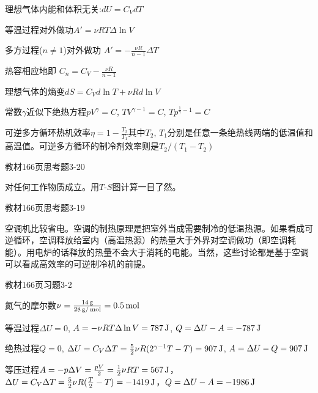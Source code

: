 \documentclass[CJK]{beamer}
\begin{document}
\begin{frame}
  \bch
  \bitem
  \item{理想气体内能和体积无关:$dU = C_V dT$}
  \item{等温过程对外做功$A'=\nu RT \Delta \ln V$}
  \item{
  多方过程($n\ne 1$)对外做功
  $A' = -\frac{\nu R}{n-1}\Delta T$
  
  热容相应地即
  $C_n = C_V - \frac{\nu R}{n-1}$}
  \item{理想气体的熵变$ dS = C_V d \ln T + \nu R d\ln V$}
  \item{常数$\gamma$近似下绝热方程$pV^\gamma = C$, $TV^{\gamma-1} =C$, $Tp^{\frac{1}{\gamma}-1} = C$}
  \item{可逆多方循环热机效率$\eta = 1- \frac{T_2}{T_1}$其中$T_2$, $T_1$分别是任意一条绝热线两端的低温值和高温值。可逆多方循环的制冷剂效率则是$T_2/(T_1-T_2)$}
  \eitem
  \ech  
\end{frame}

\begin{frame}
  \bch
  教材166页思考题3-20
  \ech
\end{frame}


\begin{frame}
  \bch
  对任何工作物质成立。用$T$-$S$图计算一目了然。
  \ech
\end{frame}

\begin{frame}
  \bch
  教材166页思考题3-19
  \ech
\end{frame}


\begin{frame}
  \bch
  空调机比较省电。空调的制热原理是把室外当成需要制冷的低温热源。如果看成可逆循环，空调释放给室内（高温热源）的热量大于外界对空调做功（即空调耗能）。用电炉的话释放的热量不会大于消耗的电能。当然，这些讨论都是基于空调可以看成高效率的可逆制冷机的前提。
  \ech
\end{frame}

\begin{frame}
  \bch
  教材166页习题3-2
  
  \ech
\end{frame}


\begin{frame}
  \bch
  {\scriptsize
  氮气的摩尔数$\nu = \frac{14\,\mathrm{g}}{28\,\mathrm{g}/\,\mathrm{mol}} = 0.5\,\mathrm{mol}$
  \bitem
\item{等温过程$\Delta U = 0$, $A = -\nu R T\Delta \ln V = 787\,\mathrm{J}$, $Q = \Delta U - A = - 787\,\mathrm{J}$
}
\item{绝热过程$Q=0$, $\Delta U = C_V \Delta T = \frac{5}{2}\nu R (2^{\gamma-1}T -T) = 907\,\mathrm{J}$, $A = \Delta U - Q = 907\,\mathrm{J}$}
\item{等压过程$A = -p\Delta V = \frac{pV}{2} = \frac{1}{2}\nu R T = 567\,\mathrm{J}$，$\Delta U = C_V \Delta T = \frac{5}{2}\nu R (\frac{T}{2}-T) = -1419\,\mathrm{J}$，$Q = \Delta U - A = -1986 \,\mathrm{J}$}
  \eitem
  }
  \ech
\end{frame}
\end{document}
